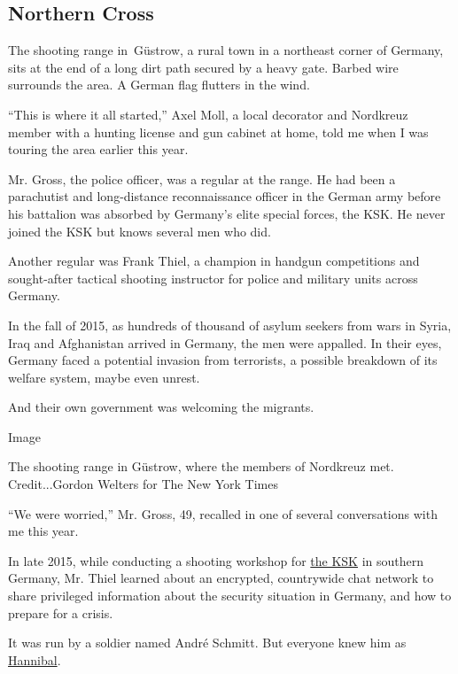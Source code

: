 \hypertarget{northern-cross}{%
\subsection{Northern Cross}\label{northern-cross}}

The shooting range in~Güstrow, a rural town in a northeast corner of
Germany, sits at the end of a long dirt path secured by a heavy gate.
Barbed wire surrounds the area. A German flag flutters in the wind.

``This is where it all started,'' Axel Moll, a local decorator and
Nordkreuz member with a hunting license and gun cabinet at home, told me
when I was touring the area earlier this year.

Mr. Gross, the police officer, was a regular at the range. He had been a
parachutist and long-distance reconnaissance officer in the German army
before his battalion was absorbed by Germany's elite special forces, the
KSK. He never joined the KSK but knows several men who did.

Another regular was Frank Thiel, a champion in handgun competitions and
sought-after tactical shooting instructor for police and military units
across Germany.

In the fall of 2015, as hundreds of thousand of asylum seekers from wars
in Syria, Iraq and Afghanistan arrived in Germany, the men were
appalled. In their eyes, Germany faced a potential invasion from
terrorists, a possible breakdown of its welfare system, maybe even
unrest.

And their own government was welcoming the migrants.

Image

The shooting range in Güstrow, where the members of Nordkreuz met.
Credit...Gordon Welters for The New York Times

``We were worried,'' Mr. Gross, 49, recalled in one of several
conversations with me this year.

In late 2015, while conducting a shooting workshop for
\href{https://www.nytimes3xbfgragh.onion/2020/07/03/world/europe/germany-military-neo-nazis-ksk.html?searchResultPosition=2}{the
KSK} in southern Germany, Mr. Thiel learned about an encrypted,
countrywide chat network to share privileged information about the
security situation in Germany, and how to prepare for a crisis.

It was run by a soldier named André Schmitt. But everyone knew him as
\href{https://www.nytimes3xbfgragh.onion/2020/07/03/world/europe/germany-military-neo-nazis-ksk.html?searchResultPosition=1}{Hannibal}.

